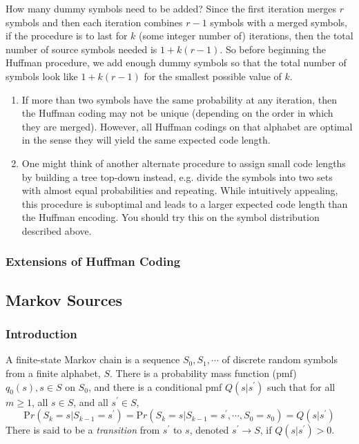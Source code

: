 \documentclass{article}
\begin{document}
How many dummy symbols need to be added? Since the first iteration merges $r$ symbols and then each iteration combines $r-1$ symbols with a merged symbols, if the procedure is to last for $k$ (some integer number of) iterations, then the total number of source symbols needed is $1+k(r-1)$. So before beginning the Huffman procedure, we add enough dummy symbols so that the total number of symbols look like $1+k(r-1)$ for the smallest possible value of $k$.

\begin{enumerate}
    \item If more than two symbols have the same probability at any iteration, then the Huffman coding may not be unique (depending on the order in which they are merged). However, all Huffman codings on that alphabet are optimal in the sense they will yield the same expected code length.	
    \item 	One might think of another alternate procedure to assign small code lengths by building a tree top-down instead, e.g. divide the symbols into two sets with almost equal probabilities and repeating. While intuitively appealing, this procedure is suboptimal and leads to a larger expected code length than the Huffman encoding. You should try this on the symbol distribution described above.
\end{enumerate}

\subsubsection{Extensions of Huffman Coding}

\subsection{Markov Sources}

\subsubsection{Introduction}

A finite-state Markov chain is a sequence $S_{0},S_{1}, \cdots$ of discrete random sym­bols from a finite alphabet, $S$. There is a probability mass function (pmf) $q_{0}(s), s \in S$ on $S_{0}$, and there is a conditional pmf $Q(s|s^{\prime})$ such that for all $m \geq 1$, all $s \in S$, and all $s^{\prime} \in S$,
    \[{\mathrm Pr}(S_{k}=s|S_{k-1}=s^{\prime})={\mathrm Pr}(S_{k}=s|S_{k-1}=s^{\prime},\cdots,S_{0}=s_{0})=Q(s|s^{\prime})\]
    There is said to be a \emph{transition} from $s^{\prime}$ to $s$, denoted $s^{\prime} \to S$, if $Q(s|s^{\prime})>0$. \cite{mitCh2}
\end{document}
